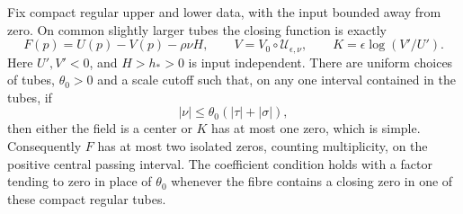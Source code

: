 \begin{proposition}
\label{rw:finite:regular-count}
Fix compact regular upper and lower data, with the input bounded
away from zero. On common slightly larger tubes the closing function
is exactly
\[
 F(p)=U(p)-V(p)-\rho\nu H,
 \qquad V=V_0\circ\mathcal U_{\epsilon,\nu},
 \qquad K=\epsilon\log(V'/U').
\]
Here $U',V'<0$, and $H>h_*>0$ is input independent.
There are uniform choices of tubes, $\theta_0>0$ and a scale cutoff
such that, on any one interval contained in the tubes, if
\begin{equation}\label{rw:finite:regular-forcing}
 |\nu|\le\theta_0(|\tau|+|\sigma|),
\end{equation}
then either the field is a center or $K$ has at most one zero,
which is simple. Consequently $F$ has at most two isolated zeros,
counting multiplicity, on the positive central passing interval.
The coefficient condition holds with a factor tending to zero in
place of $\theta_0$ whenever the fibre contains a closing zero
in one of these compact regular tubes.
\end{proposition}
